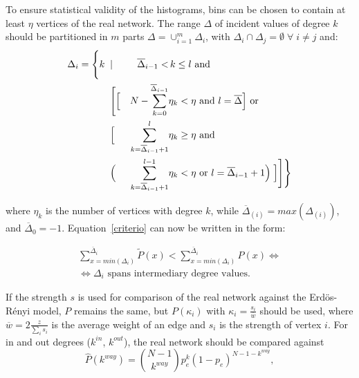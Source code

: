To ensure statistical validity of the histograms, bins can be chosen to contain at least $\eta$ vertices of the real network.
The range $\Delta$ of incident values of degree $k$ should be partitioned in $m$ parts $\Delta=\cup_{i=1}^m \Delta_i$,
with $\Delta_i\cap \Delta_j=\emptyset \; \forall\; i \neq j$ and:
\begin{align}
\Delta_i =\Biggl\{ k\;\; & | & \overline{\Delta}_{i-1}< &\, k\leq l \text{ and }\;\;\;\;\;\;\;\;\;\;\;\;\nonumber\\
                         & \Biggl[ \Bigl[ & N - \sum_{k=0}^{\overline{\Delta}_{i-1}} & \eta_k< \eta \text{ and } l = \overline{\Delta} \Bigr] \text{ or }\\
&	\Bigl[ & \sum_{k=\overline{\Delta}_{i-1}+1}^l &  \eta_k \geq \eta \text{ and }\;\;\;\;\;\;\nonumber\\
& \Bigl( &\sum_{k=\overline{\Delta}_{i-1}+1}^{l-1} &  \eta_k < \eta \text{ or }   l=\overline{\Delta}_{i-1}+1 \Bigr) \;\Bigr] \Biggr] \Biggr\}\nonumber
\end{align}

\noindent where $\eta_k$ is the number of vertices with degree $k$,
while $\overline{\Delta}_{(i)}=max(\Delta_{(i)})$, and $\overline{\Delta}_{0}=-1$.
Equation~\ref{criterio} can now be written in the form:

\begin{equation}\label{criterio2}
\begin{split}
\sum_{x=min(\Delta_i)}^{\overline{\Delta}_i} \widetilde{P}(x) < \sum_{x=min(\Delta_i)}^{\overline{\Delta}_i} P(x) \Leftrightarrow \\
\Leftrightarrow \Delta_i \text{ spans intermediary degree values.}
\end{split}
\end{equation}

If the strength $s$ is used for comparison of the real network against the Erd\"os-R\'enyi model,
$P$ remains the same, but $P(\kappa_i)$ with $\kappa_i=\frac{s_i}{\overline{w}}$ should be used, where $\overline{w}=2\frac{z}{\sum_is_i}$ is the average weight of an edge and $s_i$ is the strength of vertex $i$. For in and out degrees ($k^{in}$, $k^{out}$), the real network should be compared against
\begin{equation}
\hat{P}(k^{way})=\binom{N-1}{k^{way}}p_e^k(1-p_e)^{N-1-k^{way}},
\end{equation}

